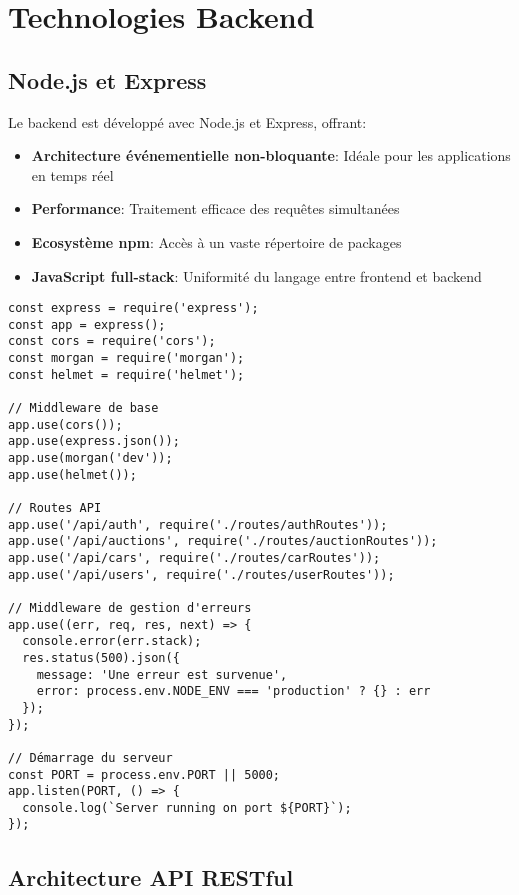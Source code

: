 \section{Technologies Backend}

\subsection{Node.js et Express}

Le backend est développé avec Node.js et Express, offrant:

\begin{itemize}
    \item \textbf{Architecture événementielle non-bloquante}: Idéale pour les applications en temps réel
    \item \textbf{Performance}: Traitement efficace des requêtes simultanées
    \item \textbf{Ecosystème npm}: Accès à un vaste répertoire de packages
    \item \textbf{JavaScript full-stack}: Uniformité du langage entre frontend et backend
\end{itemize}

\begin{verbatim}
const express = require('express');
const app = express();
const cors = require('cors');
const morgan = require('morgan');
const helmet = require('helmet');

// Middleware de base
app.use(cors());
app.use(express.json());
app.use(morgan('dev'));
app.use(helmet());

// Routes API
app.use('/api/auth', require('./routes/authRoutes'));
app.use('/api/auctions', require('./routes/auctionRoutes'));
app.use('/api/cars', require('./routes/carRoutes'));
app.use('/api/users', require('./routes/userRoutes'));

// Middleware de gestion d'erreurs
app.use((err, req, res, next) => {
  console.error(err.stack);
  res.status(500).json({ 
    message: 'Une erreur est survenue',
    error: process.env.NODE_ENV === 'production' ? {} : err
  });
});

// Démarrage du serveur
const PORT = process.env.PORT || 5000;
app.listen(PORT, () => {
  console.log(`Server running on port ${PORT}`);
});
\end{verbatim}

\subsection{Architecture API RESTful}

